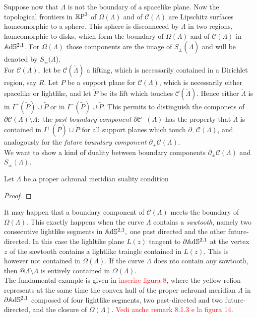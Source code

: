 Suppose now that $\Lambda$ is not the boundary of a spacelike plane. Now the topological frontiers in $\mathbb{R}\text{P}^3$ of $\Omega(\Lambda)$ and of $\mathcal{C}(\Lambda)$ are Lipschitz surfaces homeomorphic to a sphere. This sphere is disconneced by $\Lambda$ in two regions, homeomorphic to disks, which form the boundary of $\Omega(\Lambda)$ and of $\mathcal{C}(\Lambda)$ in $\mathbb{A}\mathrm{d}\mathbb{S}^{2,1}$. For $\Omega(\Lambda)$ those components are the image of $S_\pm(\widetilde{\Lambda})$ and will be denoted by $S_\pm(\Lambda$). \\
For $\mathcal{C}(\Lambda),$ let be $\mathcal{C}(\widetilde{\Lambda})$ a lifting, which is necessarily contained in a Dirichlet region, say $R$. Let $P$ be a support plane for $\mathcal{C}(\Lambda)$, which is necessarily either spacelike or lightlike, and let $\widetilde{P}$ be its lift which touches $\mathcal{C}(\widetilde{\Lambda}).$ Hence either $\widetilde{\Lambda}$ is in $I^+(\widetilde{P})\cup\widetilde{P}$ or in $I^-(\widetilde{P})\cup\widetilde{P}$. This permits to distinguish the componets of $\partial\mathcal{C}(\Lambda)\setminus\Lambda:$ the \textit{past boundary component} $\partial\mathcal{C}_-(\Lambda)$ has the property that $\widetilde{\Lambda}$ is contained in $I^+(\widetilde{P})\cup \widetilde{P}$ for all support planes which touch $\partial_-\mathcal{C}(\Lambda)$, and analogously for the \textit{future boundary component} $\partial_+\mathcal{C}(\Lambda)$.\\
We want to show a kind of duality between boundary components $\partial_\pm\mathcal{C}(\Lambda)$ and $S_\pm(\Lambda)$. 

\begin{proposition}
Let $\Lambda$ be a proper achronal meridian suality condition 
\end{proposition}
\begin{proof}
    
\end{proof}

\begin{observation}\label{465}
    It may happen that a boundary component of $\mathcal{C}(\Lambda)$ meets the boundary of $\Omega(\Lambda)$. This exactly happens when the curve $\Lambda$ contains a \textit{sawtooth}, namely two consecutive lightlike segments in $\mathbb{A}\mathrm{d}\mathbb{S}^{2,1},$ one past directed and the other future-directed. In this case the lighltike plane $L(z)$ tangent to $\partial\mathbb{A}\mathrm{d}\mathbb{S}^{2,1}$ at the vertex $z$ of the sawtooth contains a lightlike traingle contained in $L(z)$. This is however not contained in $\Omega(\Lambda)$. If the curve $\Lambda$ does nto contain any sawtooth, then $@\mathcal{\Lambda}\setminus\Lambda$ is entirely contained in $\Omega(\Lambda)$.\\
    The fundamental example is given in \textcolor{red}{inserire figura 8}, where the yellow refion represents at the same time the convex hull of the proper achronal meridian $\Lambda$ in $\partial\mathbb{A}\mathrm{d}\mathbb{S}^{2,1}$ composed of four lightlike segments, two past-directed and two future-directed, and the closure of $\Omega(\Lambda).$ \textcolor{red}{Vedi anche remark 8.1.3 e la figura 14.} 
\end{observation}

